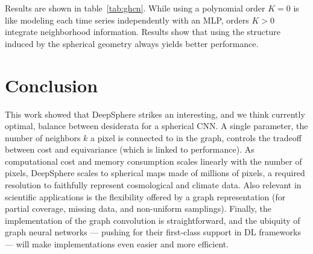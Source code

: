 \documentclass{article} %
\newcommand{\todo}[1]{{\color[rgb]{.6,.1,.6}{#1}}}
\newcommand{\tabref}[1]{table~\ref{tab:#1}}
\begin{document}
Results are shown in \tabref{ghcn}.
While using a polynomial order $K=0$ is like modeling each time series independently with an MLP, orders $K>0$ integrate neighborhood information.
Results show that using the structure induced by the spherical geometry always yields better performance.


\section{Conclusion}

This work showed that DeepSphere strikes an interesting, and we think currently optimal, balance between desiderata for a spherical CNN.
A single parameter, the number of neighbors $k$ a pixel is connected to in the graph, controls the tradeoff between cost and equivariance (which is linked to performance).
As computational cost and memory consumption scales linearly with the number of pixels, DeepSphere scales to spherical maps made of millions of pixels, a required resolution to faithfully represent cosmological and climate data.
Also relevant in scientific applications is the flexibility offered by a graph representation (for partial coverage, missing data, and non-uniform samplings).
Finally, the implementation of the graph convolution is straightforward, and the ubiquity of graph neural networks --- pushing for their first-class support in DL frameworks --- will make implementations even easier and more efficient.
\end{document}
